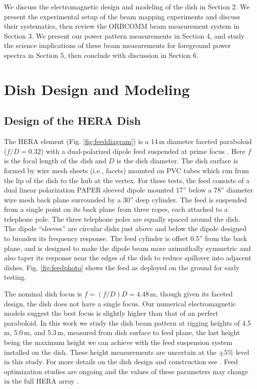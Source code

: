We discuss the electromagnetic design and modeling of the dish in Section 2. We present the 
experimental setup of the beam mapping experiments and discuss their systematics, then 
review the ORBCOMM beam measurement system in Section 3. We present our power pattern 
measurements in Section 4, and study the science implications of these beam measurements for foreground power spectra in Section 5, then conclude with discussion in Section 6.

\section{Dish Design and Modeling}

\subsection{Design of the HERA Dish}

The HERA element (Fig. \ref{fig:feeddiagram}) is a 14\,m diameter faceted paraboloid ($ f/D=0.32$) with a dual-polarized dipole feed suspended at prime focus \citep{dishmemo}. Here $f$ is the focal length of the dish and $D$ is the dish diameter. The dish surface is formed by wire mesh sheets (i.e., facets) mounted on PVC tubes which run from the lip of the dish to the hub at the vertex. For these tests, the feed consists of a dual linear polarization PAPER sleeved dipole mounted 17'' below a 78'' diameter wire mesh back plane surrounded by a 30'' deep cylinder. The feed is suspended from a single point on its back plane from three ropes, each attached to a telephone pole. The three telephone poles are equally spaced around the dish. The dipole ``sleeves'' are circular disks just above and below the dipole designed to broaden its frequency response. The feed cylinder is offset 0.5'' from the back plane, and is designed to make the dipole beam more azimuthally symmetric and also taper its response near the edges of the dish to reduce spillover into adjacent dishes. Fig. \ref{fig:feedphoto} shows the feed as deployed on the ground for early testing. 

The nominal dish focus is $f=(f/D)D=4.48$\,m, though given its faceted design, the dish does not have a single focus. Our numerical electromagnetic models suggest the best focus is slightly higher than that of an perfect paraboloid. In this work we study the dish beam pattern at rigging heights of 4.5\,m, 5.0\,m, and 5.3\,m, measured from dish surface to feed plane, the last height being the maximum height we can achieve with the feed suspension system installed on the dish. These height measurements are uncertain at the $\pm5\%$ level in this study. For more details on the dish design and construction see \citet{deboer16}. Feed optimization studies are ongoing and the values of these parameters may change in the full HERA array \citep{feedoptimizationmemo}. 

